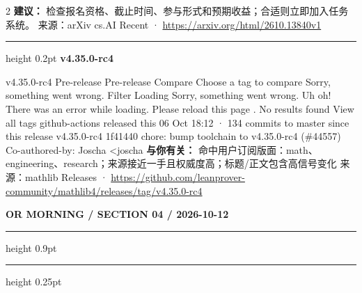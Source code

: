 \documentclass[10.5pt]{ctexart}
\begin{document}
\begin{multicols}{2}
\textbf{建议：} 检查报名资格、截止时间、参与形式和预期收益；合适则立即加入任务系统。
{\footnotesize\color{ormuted} 来源：arXiv cs.AI Recent · \url{https://arxiv.org/html/2610.13840v1}}
\vspace{2mm}
\hrule height 0.2pt
\vspace{2mm}
{\large\bfseries v4.35.0-rc4}\par
v4.35.0-rc4 Pre-release Pre-release Compare Choose a tag to compare Sorry, something went wrong. Filter Loading Sorry, something went wrong. Uh oh! There was an error while loading. Please reload this page . No results found View all tags github-actions released this 06 Oct 18:12 · 134 commits to master since this release v4.35.0-rc4 1f41440 chore: bump toolchain to v4.35.0-rc4 (\#44557) Co-authored-by: Joscha <joscha
\textbf{与你有关：} 命中用户订阅版面：math、engineering、research；来源接近一手且权威度高；标题/正文包含高信号变化
{\footnotesize\color{ormuted} 来源：mathlib Releases · \url{https://github.com/leanprover-community/mathlib4/releases/tag/v4.35.0-rc4}}
\end{multicols}
\newpage
{\small\bfseries OR MORNING / SECTION 04 / 2026-10-12}
\vspace{2mm}
\hrule height 0.9pt
\vspace{1.5mm}
\hrule height 0.25pt
\vspace{4mm}
\end{document}
